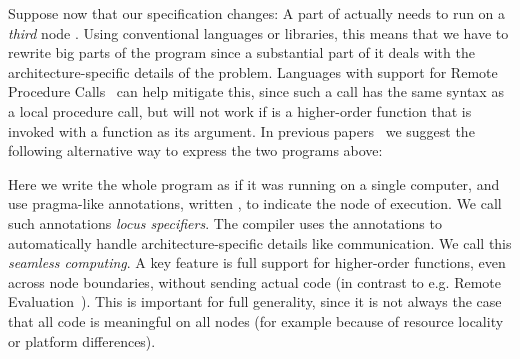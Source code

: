 \documentclass{article}
\theoremstyle{definition}
\newcommand{\Conid}[1]{\mathit{#1}}
\newcommand{\Varid}[1]{\mathit{#1}}
\def\resethooks{\global\let\SaveRestoreHook\empty
  \global\let\ColumnHook\empty}
\let\hspost\empty
\renewcommand\Varid[1]{\mathord{\textsf{#1}}}
\let\Conid\Varid
\newcommand\Keyword[1]{\textsf{\textbf{#1}}}
\newcommand\MyConid[1]{\mathord{\textsf{\textbf{#1}}}}
\renewcommand\Keyword[1]{\textsf{\underline{#1}}}
\renewcommand\Varid[1]{\textsf{#1}}
\begin{document}
Suppose now that our specification changes: A part {\textsmaller[.5]{\ensuremath{\Conid{F'}}}} of {\textsmaller[.5]{\ensuremath{\Conid{F}}}} actually needs
to run on a \emph{third} node {\textsmaller[.5]{\ensuremath{\Conid{C}}}}. Using conventional languages or libraries,
this means that we have to rewrite big parts of the program since a substantial
part of it deals with the architecture-specific details of the problem.
Languages with support for Remote Procedure
Calls~\cite{DBLP:journals/tocs/BirrelN84} can help mitigate this, since
such a call has the same syntax as a local procedure call, but will
not work if {\textsmaller[.5]{\ensuremath{\Conid{F'}}}} is a higher-order function that is invoked with a function
as its argument.
In previous
papers~\cite{DBLP:conf/lics/FredrikssonG13,DBLP:conf/tgc/FredrikssonG12} we
suggest the following alternative way to express the two programs above:
\resethooks
Here we write the whole program as if it was running on a single computer, and
use pragma-like annotations, written {\textsmaller[.5]{\ensuremath{\{\mskip1.5mu \Varid{x}\mskip1.5mu\}\;\MyConid{$\boldsymbol{@}$}\;\Conid{A}}}}, to indicate the node of
execution. We call such annotations \emph{locus specifiers}. The compiler uses
the annotations to automatically handle architecture-specific details like
communication. We call this \emph{seamless computing}.  A key feature is full
support for higher-order functions, even across node boundaries, without
sending actual code (in contrast to e.g. Remote
Evaluation~\cite{DBLP:journals/toplas/StamosG90}). This is important for full
generality, since it is not always the case that all code is meaningful on all
nodes (for example because of resource locality or platform differences).
\end{document}
